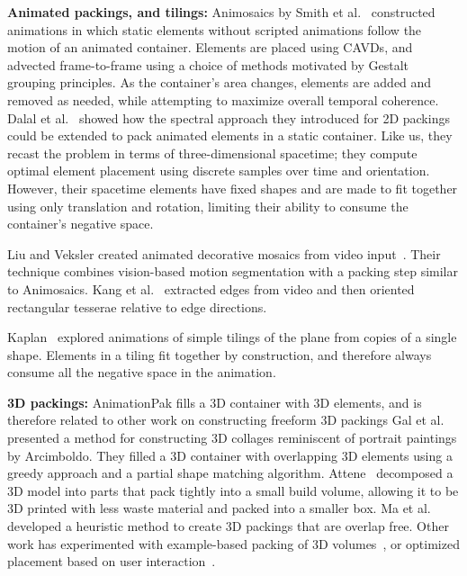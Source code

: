 \textbf{Animated packings, and tilings:}
Animosaics by Smith et al.~\cite{Smith2005} constructed animations 
in which static elements without scripted
animations follow the motion of an animated container.  Elements are
placed using CAVDs, and advected frame-to-frame using a choice of methods
motivated by Gestalt grouping principles.
As the 
container's area changes, elements are added and removed as needed,
while attempting to maximize overall temporal coherence.
Dalal et al.~\cite{Dalal2006} showed how the spectral approach they
introduced for 2D packings could be extended 
to pack animated elements in a static container.  Like us, they recast
the problem in terms of three-dimensional spacetime; they compute optimal
element placement using discrete samples over time and orientation.
However, their spacetime elements have fixed
shapes and are made to fit together using only translation and rotation, 
limiting their ability to consume the container's negative space.

Liu and Veksler created animated decorative mosaics from video
input~\cite{Liu2009}.  Their technique combines vision-based
motion segmentation with a packing step similar to Animosaics.
Kang et al.~\cite{Kang2011} extracted edges from video and 
then oriented rectangular tesserae relative to edge directions.

Kaplan~\cite{Kaplan2019} explored animations of simple tilings of
the plane from copies of a single shape.  Elements in a tiling
fit together by construction, and therefore always consume all 
the negative space in the animation.

\textbf{3D packings:} 
AnimationPak fills a 3D container with 3D elements, 
and is therefore related to other work on constructing freeform 3D
packings 
Gal et al.~\cite{Gal2007B} presented a method for constructing 3D
collages reminiscent of portrait paintings by Arcimboldo.  They
filled a 3D container with overlapping 3D elements using a greedy
approach and a partial shape matching algorithm.
Attene~\cite{Attene2015} decomposed a 3D model into parts that pack
tightly into a small build volume, allowing it to 
be 3D printed with less waste material and packed into a smaller box.
Ma et al.~\cite{Ma2018} developed a heuristic method
to create 3D packings that are overlap free.  Other work has 
experimented with example-based packing of 3D volumes~\cite{Ma2011},
or optimized placement based on user interaction~\cite{Hsu2020}.


